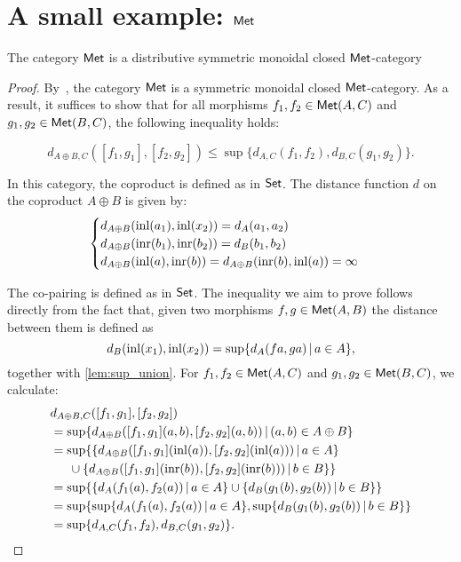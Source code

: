 \section{A small example: $\mathsf{Met}$}

\begin{proposition}
        \label{prop:vcat}
        The category $\mathsf{Met}$ is a distributive symmetric monoidal closed $\mathsf{Met}$-category 
\end{proposition}

\begin{proof}
  By~\cite[Example 3.8]{dahlqvist2022syntactic}, the category $\mathsf{Met}$ is a symmetric monoidal closed $\mathsf{Met}$-category. As a result, it suffices to show that for all morphisms \( f_1, f_2 \in \mathsf{Met}(A, C) \) and \( g_1, g_2 \in \mathsf{Met}(B, C) \), the following inequality holds:
  
\[
  d_{A \oplus B, C}([f_1, g_1], [f_2, g_2]) \leq \sup \{d_{A,C}(f_1, f_2), d_{B,C}(g_1, g_2)\}.
\]

In this category, the coproduct is defined as in $\mathsf{Set}$. The distance function $d$ on the coproduct $A \oplus B$ is given by:
   \[
    \begin{cases}
    d_{A \oplus B}(\mathrm{inl}(a_1),\mathrm{inl}(x_2)) = d_A(a_1,a_2) \\
    d_{A \oplus B}(\mathrm{inr}(b_1),\mathrm{inr}(b_2)) = d_B(b_1,b_2) \\
    d_{A \oplus B}(\mathrm{inl}(a), \mathrm{inr}(b)) = 
    d_{A \oplus B}(\mathrm{inr}(b), \mathrm{inl}(a))  = \infty
    \end{cases}
    \]

    The co-pairing is defined as in $\mathsf{Set}$. The inequality we aim to prove follows directly from the fact that, given two morphisms  $f,g\in \mathsf{Met}(A, B)$ the distance between them is defined as 
  $$ d_{B}(\mathrm{inl}(x_1),\mathrm{inl}(x_2)) = \sup \{ d_A (f a, g a) \,\vert \, a \in A \} ,$$  
    together with \autoref{lem:sup_union}. For  \( f_1, f_2 \in \mathsf{Met}(A, C) \) and \( g_1, g_2 \in \mathsf{Met}(B, C) \), we calculate:
    \begin{align*}
      & d_{A \oplus B, C}([f_1, g_1], [f_2, g_2]) \\
      &  =  \sup \{ d_{A\oplus B} ([f_1, g_1] (a,b), [f_2, g_2] (a,b)) \,\vert \, (a,b) \in A \oplus B \} \\
      & =  \sup \{ \{ d_{A\oplus B} ([f_1, g_1] (\mathrm{inl}(a)), [f_2, g_2] (\mathrm{inl}(a))) \,\vert \, a \in A \}    \\
      & \hspace{15pt} \cup \{d_{A\oplus B} ([f_1, g_1] (\mathrm{inr}(b)), [f_2, g_2] (\mathrm{inr}(b))) \,\vert \, b \in B\}\} \\
      & = \sup \{ \{ d_{A}(f_1 (a), f_2 (a)) \,\vert \, a \in A \} \cup  \{d_{B}(g_1 (b), g_2 (b)) \,\vert \, b \in B \}\} \\
      & = \sup   \{ \sup \{ d_{A}(f_1 (a), f_2 (a)) \,\vert \, a \in A \}, \sup\{d_{B}(g_1 (b), g_2 (b)) \,\vert \, b \in B \}\} \\
      &=  \sup \{d_{A,C}(f_1, f_2), d_{B,C}(g_1, g_2)\}. 
    \end{align*}
\end{proof}





